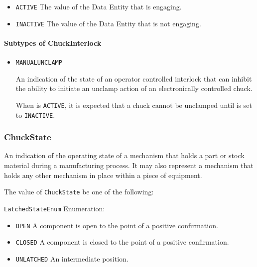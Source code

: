 \begin{itemize}
\item \texttt{ACTIVE} \newline The value of the \gls{Data Entity} that is engaging. 
\item \texttt{INACTIVE} \newline The value of the \gls{Data Entity} that is not engaging. 
\end{itemize}


\paragraph{Subtypes of ChuckInterlock}\mbox{}
\label{sec:Subtypes of ChuckInterlock}

\begin{itemize}

\item \texttt{MANUAL\textunderscore UNCLAMP}


An indication of the state of an operator controlled interlock that can inhibit the ability to initiate an unclamp action of an electronically controlled chuck.

When  is \texttt{ACTIVE}, it is expected that a chuck cannot be unclamped until  is set to \texttt{INACTIVE}. 


\end{itemize}




\subsubsection{ChuckState}
\label{sec:ChuckState}



An indication of the operating state of a mechanism that holds a part or stock material during a manufacturing process. It may also represent a mechanism that holds any other mechanism in place within a piece of equipment.


The value of \texttt{ChuckState} \MUST be one of the following: 


\texttt{LatchedStateEnum} Enumeration:

\begin{itemize}
\item \texttt{OPEN} \newline A component is open to the point of a positive confirmation. 
\item \texttt{CLOSED} \newline A component is closed to the point of a positive confirmation. 
\item \texttt{UNLATCHED} \newline An intermediate position. 
\end{itemize}



